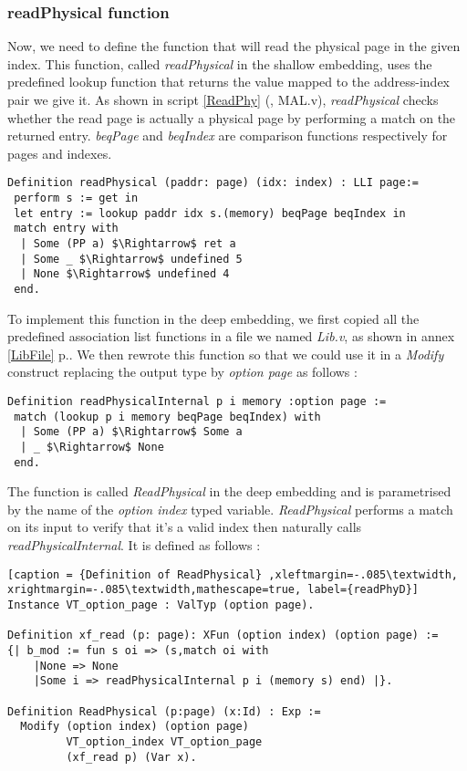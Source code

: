 \subsubsection{readPhysical function} 
Now, we need to define the function that will read the physical page in the given index. This function, called \textit{readPhysical} in the shallow embedding,  uses the predefined lookup function that returns the value mapped to the address-index pair we give it. As shown in script \ref{ReadPhy} (\cite{PIP}, MAL.v), \textit{readPhysical} checks whether the read page is actually a physical page by performing a match on the returned entry. \textit{beqPage} and \textit{beqIndex} are comparison functions respectively for pages and indexes. 
\begin{lstlisting}[caption = {readPhysical function in the shallow embedding},xleftmargin=-.06\textwidth,
xrightmargin=-.06\textwidth ,label={ReadPhy},mathescape=true]
Definition readPhysical (paddr: page) (idx: index) : LLI page:=
 perform s := get in
 let entry := lookup paddr idx s.(memory) beqPage beqIndex in
 match entry with
  | Some (PP a) $\Rightarrow$ ret a
  | Some _ $\Rightarrow$ undefined 5
  | None $\Rightarrow$ undefined 4
 end.
\end{lstlisting} \pagebreak
To implement this function in the deep embedding, we first copied all the predefined association list functions in a file we named \textit{Lib.v}, as shown in annex \ref{LibFile} p.\pageref{LibFile}. We then rewrote this function so that we could use it in a \textit{Modify} construct replacing the output type by \textit{option page} as follows :
\begin{lstlisting}[caption = {Rewritten shallow readPhysical function},xleftmargin=-.02\textwidth,
xrightmargin=-.02\textwidth,mathescape=true]
Definition readPhysicalInternal p i memory :option page := 
 match (lookup p i memory beqPage beqIndex) with
  | Some (PP a) $\Rightarrow$ Some a
  | _ $\Rightarrow$ None
 end.
\end{lstlisting} \vspace{4pt}
The function is called \textit{ReadPhysical} in the deep embedding and is parametrised by the name of the \textit{option index} typed variable. \textit{ReadPhysical} performs a match on its input to verify that it's a valid index then naturally calls \textit{readPhysicalInternal}. It is defined as follows : 
\begin{lstlisting}[caption = {Definition of ReadPhysical} ,xleftmargin=-.085\textwidth,
xrightmargin=-.085\textwidth,mathescape=true, label={readPhyD}]
Instance VT_option_page : ValTyp (option page).

Definition xf_read (p: page): XFun (option index) (option page) := 
{| b_mod := fun s oi => (s,match oi with 
   	|None => None 
   	|Some i => readPhysicalInternal p i (memory s) end) |}.

Definition ReadPhysical (p:page) (x:Id) : Exp :=
  Modify (option index) (option page) 
         VT_option_index VT_option_page 
         (xf_read p) (Var x).
\end{lstlisting} \vspace{4pt}

